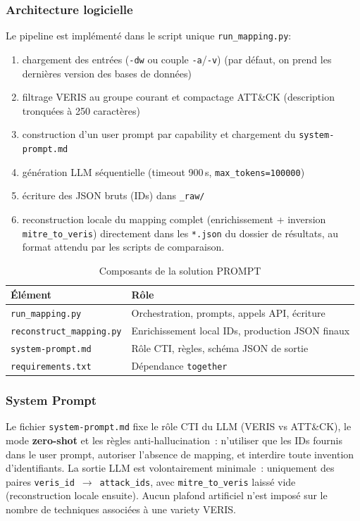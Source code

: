 \documentclass[a4paper,12pt]{article}
\begin{document}
\subsubsection{Architecture logicielle}
Le pipeline est implémenté dans le script unique \texttt{run\_mapping.py}:
\begin{enumerate}
	\item chargement des entrées (\texttt{-dw} ou couple \texttt{-a}/\texttt{-v}) (par défaut, on prend les dernières version des bases de données)
	\item filtrage VERIS au groupe courant et compactage ATT\&CK (description tronquées à 250 caractères)
    \item construction d'un user prompt par capability et chargement du \texttt{system-prompt.md}
	\item génération LLM séquentielle (timeout 900\,s, \texttt{max\_tokens=100000})
	\item écriture des JSON bruts (IDs) dans \texttt{\_raw/}
    \item reconstruction locale du mapping complet (enrichissement + inversion \texttt{mitre\_to\_veris}) directement dans les \texttt{*.json} du dossier de résultats, au format attendu par les scripts de comparaison.

\end{enumerate}

\begin{table}[H]
	\centering
	\begin{tabular}{l l}
		\toprule
		\textbf{Élément} & \textbf{Rôle} \\
		\midrule
		\texttt{run\_mapping.py} & Orchestration, prompts, appels API, écriture \\
		\texttt{reconstruct\_mapping.py} & Enrichissement local IDs, production JSON finaux \\
		\texttt{system-prompt.md}   & Rôle CTI, règles, schéma JSON de sortie \\
    	\texttt{requirements.txt}   & Dépendance \texttt{together} \\
		\bottomrule
	\end{tabular}
	\caption{Composants de la solution PROMPT}
	\label{tab:prompt-modules}
\end{table}

\subsubsection{System Prompt}
Le fichier \texttt{system-prompt.md} fixe le rôle CTI du LLM (VERIS vs ATT\&CK), le mode \textbf{zero-shot} et les règles anti-hallucination~: n'utiliser que les IDs fournis dans le user prompt, autoriser l'absence de mapping, et interdire toute invention d'identifiants. La sortie LLM est volontairement minimale~: uniquement des paires \texttt{veris\_id}~$\rightarrow$~\texttt{attack\_ids}, avec \texttt{mitre\_to\_veris} laissé vide (reconstruction locale ensuite). Aucun plafond artificiel n'est imposé sur le nombre de techniques associées à une variety VERIS.
\end{document}
